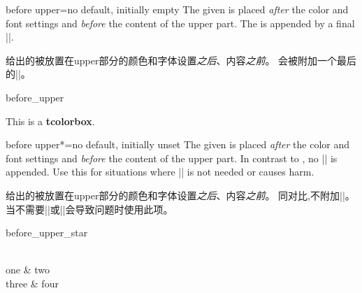 \begin{docTcbKey}{before upper}{=}{no default, initially empty}
The given  is placed \emph{after} the color and font settings
and \emph{before} the content of the upper part.
The  is appended by a final |\ignorespaces|.

给出的被放置在upper部分的颜色和字体设置\emph{之后}、内容\emph{之前}。
会被附加一个最后的|\ignorespaces|。

\begin{exdispExample}{before_upper}

\begin{tcolorbox}[title=My title]
This is a \textbf{tcolorbox}.
\end{tcolorbox}
\end{exdispExample}
\end{docTcbKey}


\begin{docTcbKey}[][doc new=2019-02-26]{before upper*}{=}{no default, initially unset}
The given  is placed \emph{after} the color and font settings
and \emph{before} the content of the upper part.
In contrast to , no |\ignorespaces| is appended.
Use this for situations where |\ignorespaces| is not needed or causes harm.

给出的被放置在upper部分的颜色和字体设置\emph{之后}、内容\emph{之前}。
同对比,不附加|\ignorespaces|。
当不需要|\ignorespaces|或|\ignorespaces|会导致问题时使用此项。

\begin{exdispExample}{before_upper_star}
\begin{tcolorbox}[size=small,tile,
colback=yellow!20,colbacktitle=yellow!70!black,
title=My table,hbox,center,center title,
before upper*=\begin{tabular}{cc},
after upper*=\end{tabular},
]
\\
one & two \\
three & four\\
\end{tcolorbox}
\end{exdispExample}
\end{docTcbKey}






